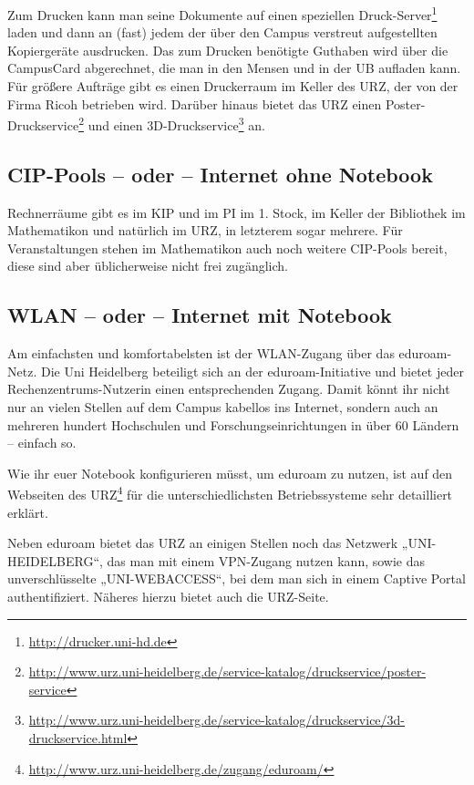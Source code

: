 Zum Drucken kann man seine Dokumente auf einen speziellen Druck-Server\footnote{\url{http://drucker.uni-hd.de}} laden und dann an (fast) jedem der über den Campus verstreut aufgestellten Kopiergeräte ausdrucken. Das zum Drucken benötigte Gut\-ha\-ben wird über die CampusCard abgerechnet, die man in den Mensen und in der \gls{UB} aufladen kann. Für größere Aufträge gibt es einen Druckerraum im Keller des \gls{URZ}, der von der Firma Ricoh betrieben wird. Darüber hinaus bietet das URZ einen Poster-Druckservice\footnote{\url{http://www.urz.uni-heidelberg.de/service-katalog/druckservice/poster-service}} und einen 3D-Druckservice\footnote{\url{http://www.urz.uni-heidelberg.de/service-katalog/druckservice/3d-druckservice.html}} an.

\subsection{CIP-Pools -- oder -- Internet ohne Notebook}
Rechnerräume gibt es im \gls{KIP} und im \gls{PI} im 1. Stock, im Keller der Bibliothek im \gls{Mathematikon} und natürlich im \gls{URZ}, in letzterem sogar mehrere. Für Veranstaltungen stehen im Mathematikon auch noch weitere CIP-Pools bereit, diese sind aber üblicherweise nicht frei zugänglich.

\subsection{WLAN -- oder -- Internet mit Notebook}

\begin{figure}[h]
    \centering
\end{figure}

Am einfachsten und komfortabelsten ist der WLAN-Zugang über das e\-du\-roam-Netz. Die Uni Heidelberg beteiligt sich an der eduroam-Initiative und bietet jeder Rechenzentrums-Nutzerin einen entsprechenden Zugang. Damit könnt ihr nicht nur an vielen Stellen auf dem Campus kabellos ins Internet, sondern auch an mehreren hundert Hochschulen und Forschungseinrichtungen in über 60 Ländern – einfach so.

Wie ihr euer Notebook konfigurieren müsst, um eduroam zu nutzen, ist auf den Webseiten des URZ\footnote{\url{http://www.urz.uni-heidelberg.de/zugang/eduroam/}} für die unterschiedlichsten Betriebssysteme sehr detailliert erklärt.

Neben eduroam bietet das URZ an einigen Stellen noch das Netzwerk „UNI-HEIDELBERG“, das man mit einem VPN-Zugang nutzen kann, sowie das unverschlüsselte „UNI-WEBACCESS“, bei dem man sich in einem Captive Portal authentifiziert. Näheres hierzu bietet auch die URZ-Seite.%

